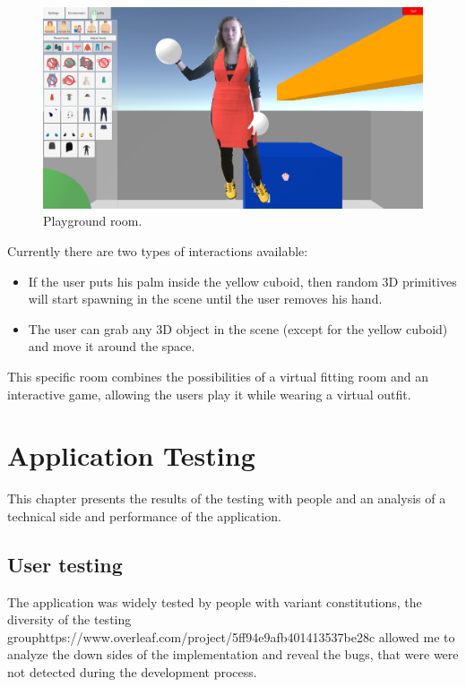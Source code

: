 \documentclass[a4paper]{report}
\begin{document}
\begin{figure}[H]
\centering
  \includegraphics[width=\textwidth, keepaspectratio]{images/Testing/Screenshot (3).png}
  
  \caption{Playground room.}
  \label{fig:playgroundRoom}
\end{figure}

Currently there are two types of interactions available:
\begin{itemize}
    \item If the user puts his palm inside the yellow cuboid, then random 3D primitives will start spawning in the scene until the user removes his hand.
    \item The user can grab any 3D object in the scene (except for the yellow cuboid) and move it around the space.
\end{itemize}

This specific room combines the possibilities of a virtual fitting room and an interactive game, allowing the users play it while wearing a virtual outfit.

\chapter{Application Testing}
\label{chapter_Testing}

\qquad This chapter presents the results of the testing with people and an analysis of a technical side and performance of the application. 

\section{User testing}
    \qquad The application was widely tested by people with variant constitutions, the diversity of the testing grouphttps://www.overleaf.com/project/5ff94e9afb401413537be28c allowed me to analyze the down sides of the implementation and reveal the bugs, that were were not detected during the development process. 
    
\end{document}
